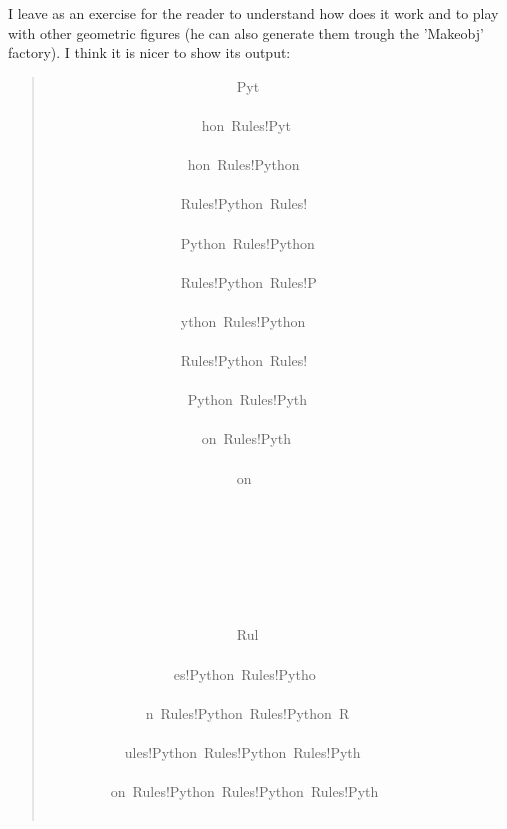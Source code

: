\documentclass[10pt,english]{article}
\begin{document}
I leave as an exercise for the reader to understand how does it work and to
play with other geometric figures (he can also generate them trough the
'Makeobj' factory). I think it is nicer to show its output:
\begin{quote}
\begin{ttfamily}\begin{flushleft}
\mbox{~~~~~~~~~~~~~~~~~~~~~~~~~~~Pyt~~~~~~~~~~~~~~~~~~~~~~~~~~~~~~~~~~~~~~}\\
\mbox{~~~~~~~~~~~~~~~~~~~~~~hon~Rules!Pyt~~~~~~~~~~~~~~~~~~~~~~~~~~~~~~~~~}\\
\mbox{~~~~~~~~~~~~~~~~~~~~hon~Rules!Python~~~~~~~~~~~~~~~~~~~~~~~~~~~~~~~~}\\
\mbox{~~~~~~~~~~~~~~~~~~~Rules!Python~Rules!~~~~~~~~~~~~~~~~~~~~~~~~~~~~~~}\\
\mbox{~~~~~~~~~~~~~~~~~~~Python~Rules!Python~~~~~~~~~~~~~~~~~~~~~~~~~~~~~~}\\
\mbox{~~~~~~~~~~~~~~~~~~~Rules!Python~Rules!P~~~~~~~~~~~~~~~~~~~~~~~~~~~~~}\\
\mbox{~~~~~~~~~~~~~~~~~~~ython~Rules!Python~~~~~~~~~~~~~~~~~~~~~~~~~~~~~~~}\\
\mbox{~~~~~~~~~~~~~~~~~~~Rules!Python~Rules!~~~~~~~~~~~~~~~~~~~~~~~~~~~~~~}\\
\mbox{~~~~~~~~~~~~~~~~~~~~Python~Rules!Pyth~~~~~~~~~~~~~~~~~~~~~~~~~~~~~~~}\\
\mbox{~~~~~~~~~~~~~~~~~~~~~~on~Rules!Pyth~~~~~~~~~~~~~~~~~~~~~~~~~~~~~~~~~}\\
\mbox{~~~~~~~~~~~~~~~~~~~~~~~~~~~on~~~~~~~~~~~~~~~~~~~~~~~~~~~~~~~~~~~~~~~}\\
\mbox{~~~~~~~~~~~~~~~~~~~~~~~~~~~~~~~~~~~~~~~~~~~~~~~~~~~~~~~~~~~~~~~~~~~~}\\
\mbox{~~~~~~~~~~~~~~~~~~~~~~~~~~~~~~~~~~~~~~~~~~~~~~~~~~~~~~~~~~~~~~~~~~~~}\\
\mbox{~~~~~~~~~~~~~~~~~~~~~~~~~~~~~~~~~~~~~~~~~~~~~~~~~~~~~~~~~~~~~~~~~~~~}\\
\mbox{~~~~~~~~~~~~~~~~~~~~~~~~~~~Rul~~~~~~~~~~~~~~~~~~~~~~~~~~~~~~~~~~~~~~}\\
\mbox{~~~~~~~~~~~~~~~~~~es!Python~Rules!Pytho~~~~~~~~~~~~~~~~~~~~~~~~~~~~~}\\
\mbox{~~~~~~~~~~~~~~n~Rules!Python~Rules!Python~R~~~~~~~~~~~~~~~~~~~~~~~~~}\\
\mbox{~~~~~~~~~~~ules!Python~Rules!Python~Rules!Pyth~~~~~~~~~~~~~~~~~~~~~~}\\
\mbox{~~~~~~~~~on~Rules!Python~Rules!Python~Rules!Pyth~~~~~~~~~~~~~~~~~~~~}\\

\end{flushleft}
\end{ttfamily}
\end{quote}
\end{document}
